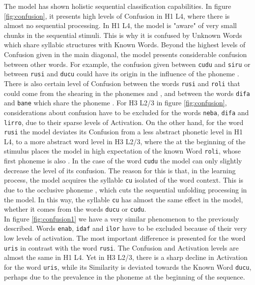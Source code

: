 \documentclass[11pt,a4paper]{article}
\begin{document}
The model has shown holistic sequential classification capabilities.
In figure \ref{fig:confusion}, it presents high levels of Confusion
in H1 L4, where there is almost no sequential processing.
In H1 L4, the model is "aware" of very small chunks in the sequential stimuli.
This is why it is confused by Unknown Words which share syllabic structures
with Known Words.
Beyond the highest levels of Confusion given in the main diagonal, the model presents
considerable confusion between other words.
For example, the confusion given between \texttt{cudu} and \texttt{siru} or between
\texttt{rusi} and \texttt{ducu} could have its origin in the influence of the phoneme \textipa{[u]}.
There is also certain level of Confusion between the words \texttt{rusi} and \texttt{roli}
that could come from the shearing in the phonemes \textipa{[r]} and \textipa{[i]},
and between the words \texttt{difa} and \texttt{bane} which share the phoneme
\textipa{[a]}.
For H3 L2/3 in figure \ref{fig:confusion}, considerations about confusion have to be excluded
for the words \texttt{neba}, \texttt{difa} and \texttt{lirro}, due to their sparse levels of Activation.
On the other hand, for the word \texttt{rusi} the model deviates its Confusion from a
less abstract phonetic level in H1 L4, to a more abstract word level in H3 L2/3, where
the \textipa{[r]} at the beginning of the stimulus places the model in high expectation of the
known Word \texttt{roli}, whose first phoneme is also \textipa{[r]}.
In the case of the word \texttt{cudu} the model can only slightly decrease the level of its confusion.
The reason for this is that, in the learning process, the model acquires the syllable \texttt{cu}
isolated of the word context.
This is due to the occlusive phoneme \textipa{[c]}, which cuts the sequential unfolding processing
in the model.
In this way, the syllable \texttt{cu} has almost the same effect in the model, whether
it comes from the words \texttt{ducu} or \texttt{cudu}.\\

In figure \ref{fig:confusion1} we have a very similar phenomenon to the previously described.
Words \texttt{enab}, \texttt{idaf} and \texttt{ilor} have to be excluded because of their
very low levels of activation.
The most important difference is presented for the word \texttt{uris} in contrast
with the word \texttt{rusi}.
The Confusion and Activation levels are almost the same in H1 L4.
Yet in H3 L2/3, there is a sharp decline in Activation for the word \texttt{uris},
while its Similarity is deviated towards the Known Word \texttt{ducu},
perhaps due to the prevalence in the phoneme \textipa{[u]} at the beginning of the sequence.\\
\end{document}
